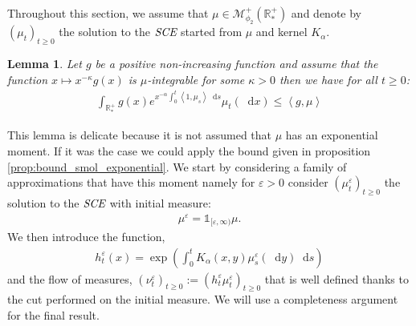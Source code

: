 \documentclass[11pt,a4paper]{article}
\newcommand{\RRP}{\mathbb{R}^+_*}
\newcommand{\MC}{\mathcal{M}}
\newcommand{\SCE}{\emph{SCE}}
\newcommand{\Proc}[1]{\left(#1\right)_{t\geq 0}}
\newcommand{\brac}[1]{\left\langle#1\right\rangle}
\newcommand{\dd}{\mathop{}\!\mathrm{d}}
\newtheorem{lemma}[theorem]{Lemma}
\begin{document}
Throughout this section, we assume that $\mu \in \MC^+_{\phi_2}(\RRP)$ and denote by $\Proc{\mu_t}$ the solution to the $\SCE$ started from $\mu$ and kernel $K_\alpha$.
\begin{lemma}\label{lem:exponential-moments}
    Let $g$ be a positive non-increasing function and assume that the function $x \mapsto x^{-\kappa}g(x)$ is $\mu$-integrable for some $\kappa > 0$ then we have for all $t \geq 0$:
    \begin{align*}
        \int_{\RRP} g(x)e^{x^{-\alpha}\int_0^t \brac{1,\mu_s} \dd s} \mu_t(\dd x) \leq \brac{g,\mu}
    \end{align*}
\end{lemma}
This lemma is delicate because it is not assumed that $\mu$ has an exponential moment. If it was the case we could apply the bound given in proposition \ref{prop:bound_smol_exponential}. We start by considering a family of approximations that have this moment namely for $\varepsilon > 0$ consider $\Proc{\mu_t^\varepsilon}$ the solution to the $\SCE$ with initial measure:
\begin{align*}
    \mu^\varepsilon = \mathds{1}_{[\varepsilon,\infty)}\mu.
\end{align*}
We then introduce the function,
\begin{align*}
    h_t^\varepsilon(x) = \exp{\left(\int_0^t K_\alpha(x,y)\mu_s^\varepsilon(\dd y) \dd s \right)}
\end{align*}
and the flow of measures, $\Proc{\nu_t^\varepsilon} := \Proc{h_t^\varepsilon\mu_t^\varepsilon}$ that is well defined thanks to the cut performed on the initial measure. We will use a completeness argument for the final result.
\end{document}
